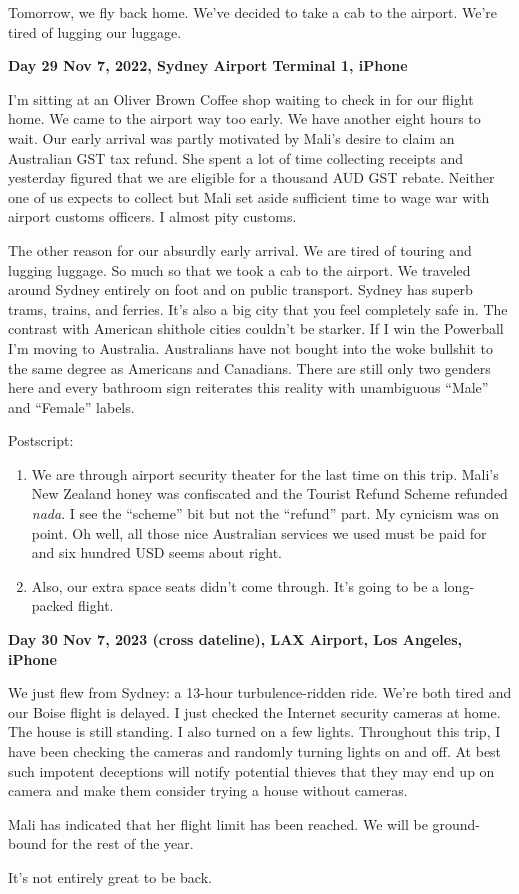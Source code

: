 Tomorrow, we fly back home. We've decided to take a cab to the airport.
We're tired of lugging our luggage.

\textbf{Day 29 Nov 7, 2022, Sydney Airport Terminal 1, iPhone}

I'm sitting at an Oliver Brown Coffee shop waiting to check in for our
flight home. We came to the airport way too early. We have another eight
hours to wait. Our early arrival was partly motivated by Mali's desire
to claim an Australian GST tax refund. She spent a lot of time
collecting receipts and yesterday figured that we are eligible for a
thousand AUD GST rebate. Neither one of us expects to collect but Mali
set aside sufficient time to wage war with airport customs officers. I
almost pity customs.

The other reason for our absurdly early arrival. We are tired of touring
and lugging luggage. So much so that we took a cab to the airport. We
traveled around Sydney entirely on foot and on public transport. Sydney
has superb trams, trains, and ferries. It's also a big city that you
feel completely safe in. The contrast with American shithole cities
couldn't be starker. If I win the Powerball I'm moving to Australia.
Australians have not bought into the woke bullshit to the same degree as
Americans and Canadians. There are still only two genders here and every
bathroom sign reiterates this reality with unambiguous ``Male'' and
``Female'' labels.

Postscript:

\begin{enumerate}
\def\labelenumi{\arabic{enumi}.}
\item
  We are through airport security theater for the last time on this
  trip. Mali's New Zealand honey was confiscated and the Tourist Refund
  Scheme refunded \emph{nada}. I see the ``scheme'' bit but not the
  ``refund'' part. My cynicism was on point. Oh well, all those
  nice Australian services we used must be paid for and six hundred USD
  seems about right.
\item
  Also, our extra space seats didn't come through. It's going to be a
  long-packed flight.
\end{enumerate}

\textbf{Day 30 Nov 7, 2023 (cross dateline), LAX Airport, Los Angeles, iPhone}

We just flew from Sydney: a 13-hour turbulence-ridden ride. We're both
tired and our Boise flight is delayed. I just checked the Internet
security cameras at home. The house is still standing. I also turned on
a few lights. Throughout this trip, I have been checking the cameras and
randomly turning lights on and off. At best such impotent deceptions
will notify potential thieves that they may end up on camera and make
them consider trying a house without cameras.

Mali has indicated that her flight limit has been reached. We will be
ground-bound for the rest of the year.

It's not entirely great to be back.

%

